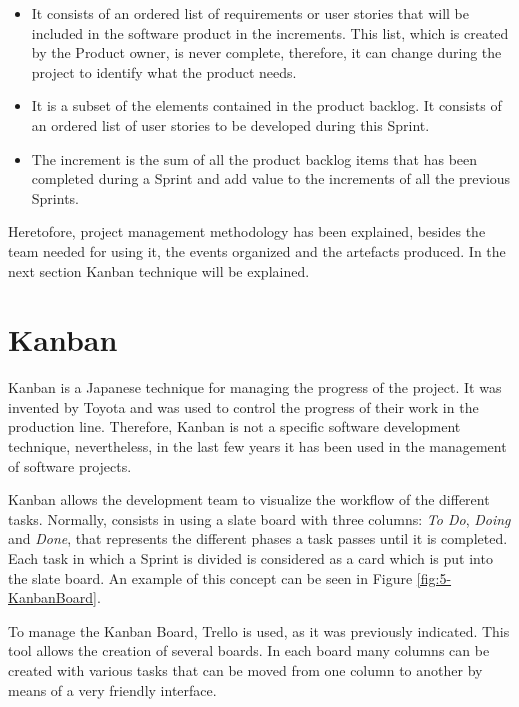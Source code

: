 \begin{itemize}
	\item {} It consists of an ordered list of requirements or user stories that will be included in the software product in the increments. This list, which is created by the Product owner, is never complete, therefore, it can change during the project to identify what the product needs. 
	
	\item {} It is a subset of the elements contained in the product backlog. It consists of an ordered list of user stories to be developed during this Sprint.
	
	\item {} The increment is the sum of all the product backlog items that has been completed during a Sprint and add value to the increments of all the previous Sprints.
\end{itemize}

Heretofore,  project management methodology has been explained, besides the team needed for using it, the events organized and the artefacts produced. In the next section Kanban technique will be explained.


\section{Kanban}
Kanban \cite{Gar11,KS10} is a Japanese technique for managing the progress of the project. It was invented by Toyota and was used to control the progress of their work in the production line. Therefore, Kanban is not a specific software development technique, nevertheless, in the last few years it has been used in the management of software projects.

Kanban allows the development team to visualize the workflow of the different tasks. Normally, consists in using a slate board with three columns: \emph{To Do}, \emph{Doing} and \emph{Done}, that represents the different phases a task passes until it is completed. Each task in which a Sprint is divided is considered as a card which is put into the slate board. An example of this concept can be seen in Figure \ref{fig:5-KanbanBoard}.

To manage the Kanban Board, Trello is used, as it was previously indicated. This tool allows the creation of several boards. In each board many columns can be created with various tasks that can be moved from one column to another by means of a very friendly interface.

